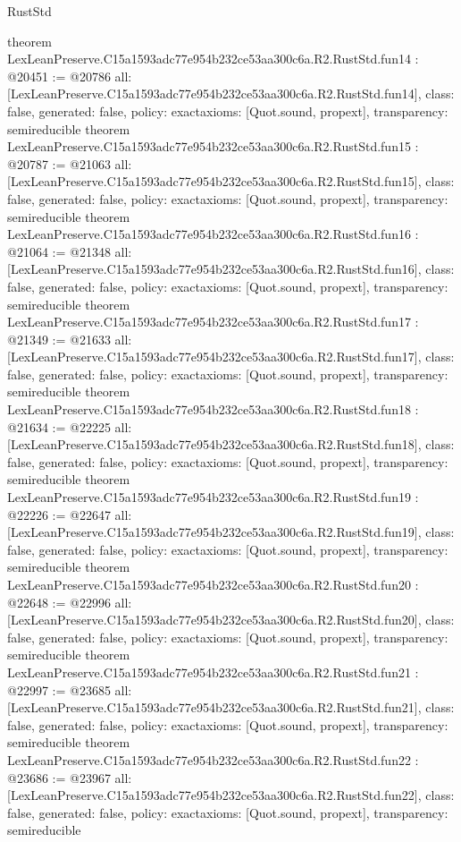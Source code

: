 \begin{lexlean}{RustStd}
\begin{coremodule}
{}
theorem LexLeanPreserve.C15a1593adc77e954b232ce53aa300c6a.R2.RustStd.fun14 : @20451 := @20786 {
  all: [LexLeanPreserve.C15a1593adc77e954b232ce53aa300c6a.R2.RustStd.fun14],
  class: false,
  generated: false,
  policy: exact{axioms: [Quot.sound, propext]},
  transparency: semireducible
}
theorem LexLeanPreserve.C15a1593adc77e954b232ce53aa300c6a.R2.RustStd.fun15 : @20787 := @21063 {
  all: [LexLeanPreserve.C15a1593adc77e954b232ce53aa300c6a.R2.RustStd.fun15],
  class: false,
  generated: false,
  policy: exact{axioms: [Quot.sound, propext]},
  transparency: semireducible
}
theorem LexLeanPreserve.C15a1593adc77e954b232ce53aa300c6a.R2.RustStd.fun16 : @21064 := @21348 {
  all: [LexLeanPreserve.C15a1593adc77e954b232ce53aa300c6a.R2.RustStd.fun16],
  class: false,
  generated: false,
  policy: exact{axioms: [Quot.sound, propext]},
  transparency: semireducible
}
theorem LexLeanPreserve.C15a1593adc77e954b232ce53aa300c6a.R2.RustStd.fun17 : @21349 := @21633 {
  all: [LexLeanPreserve.C15a1593adc77e954b232ce53aa300c6a.R2.RustStd.fun17],
  class: false,
  generated: false,
  policy: exact{axioms: [Quot.sound, propext]},
  transparency: semireducible
}
theorem LexLeanPreserve.C15a1593adc77e954b232ce53aa300c6a.R2.RustStd.fun18 : @21634 := @22225 {
  all: [LexLeanPreserve.C15a1593adc77e954b232ce53aa300c6a.R2.RustStd.fun18],
  class: false,
  generated: false,
  policy: exact{axioms: [Quot.sound, propext]},
  transparency: semireducible
}
theorem LexLeanPreserve.C15a1593adc77e954b232ce53aa300c6a.R2.RustStd.fun19 : @22226 := @22647 {
  all: [LexLeanPreserve.C15a1593adc77e954b232ce53aa300c6a.R2.RustStd.fun19],
  class: false,
  generated: false,
  policy: exact{axioms: [Quot.sound, propext]},
  transparency: semireducible
}
theorem LexLeanPreserve.C15a1593adc77e954b232ce53aa300c6a.R2.RustStd.fun20 : @22648 := @22996 {
  all: [LexLeanPreserve.C15a1593adc77e954b232ce53aa300c6a.R2.RustStd.fun20],
  class: false,
  generated: false,
  policy: exact{axioms: [Quot.sound, propext]},
  transparency: semireducible
}
theorem LexLeanPreserve.C15a1593adc77e954b232ce53aa300c6a.R2.RustStd.fun21 : @22997 := @23685 {
  all: [LexLeanPreserve.C15a1593adc77e954b232ce53aa300c6a.R2.RustStd.fun21],
  class: false,
  generated: false,
  policy: exact{axioms: [Quot.sound, propext]},
  transparency: semireducible
}
theorem LexLeanPreserve.C15a1593adc77e954b232ce53aa300c6a.R2.RustStd.fun22 : @23686 := @23967 {
  all: [LexLeanPreserve.C15a1593adc77e954b232ce53aa300c6a.R2.RustStd.fun22],
  class: false,
  generated: false,
  policy: exact{axioms: [Quot.sound, propext]},
  transparency: semireducible
}
\end{coremodule}
\end{lexlean}
